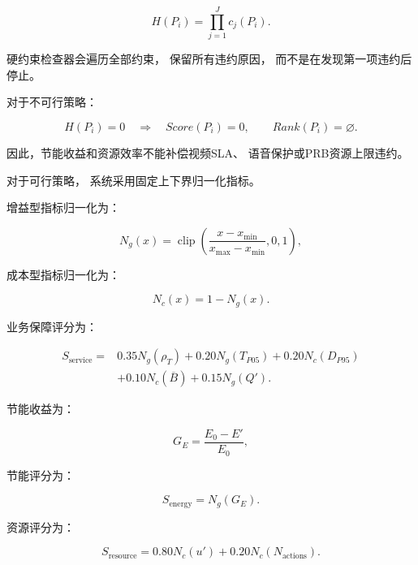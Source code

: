 \documentclass[lang=cn,12pt]{elegantbook}
\begin{document}
\begin{equation}
H(P_i)
=
\prod_{j=1}^{J}
c_j(P_i).
\label{eq:policy_feasibility_reduced}
\end{equation}

硬约束检查器会遍历全部约束，
保留所有违约原因，
而不是在发现第一项违约后停止。

对于不可行策略：

\begin{equation}
H(P_i)=0
\quad\Longrightarrow\quad
Score(P_i)=0,
\qquad
Rank(P_i)=\varnothing.
\label{eq:infeasible_policy_reduced}
\end{equation}

因此，节能收益和资源效率不能补偿视频SLA、
语音保护或PRB资源上限违约。

对于可行策略，
系统采用固定上下界归一化指标。

增益型指标归一化为：

\begin{equation}
N_g(x)
=
\operatorname{clip}
\left(
\frac{x-x_{\min}}
{x_{\max}-x_{\min}},
0,
1
\right),
\label{eq:gain_normalization_reduced}
\end{equation}

成本型指标归一化为：

\begin{equation}
N_c(x)
=
1-N_g(x).
\label{eq:cost_normalization_reduced}
\end{equation}

业务保障评分为：

\begin{equation}
\begin{aligned}
S_{\mathrm{service}}
={}&
0.35N_g(\rho_T)
+
0.20N_g(T_{P05})
+
0.20N_c(D_{P95})
\\
&+
0.10N_c(\overline{B})
+
0.15N_g(Q').
\end{aligned}
\label{eq:service_score_reduced}
\end{equation}

节能收益为：

\begin{equation}
G_E
=
\frac{
E_0-E'
}{
E_0
},
\label{eq:energy_gain_reduced}
\end{equation}

节能评分为：

\begin{equation}
S_{\mathrm{energy}}
=
N_g(G_E).
\label{eq:energy_score_reduced}
\end{equation}

资源评分为：

\begin{equation}
S_{\mathrm{resource}}
=
0.80N_c(u')
+
0.20N_c(N_{\mathrm{actions}}).
\label{eq:resource_score_reduced}
\end{equation}
\end{document}
